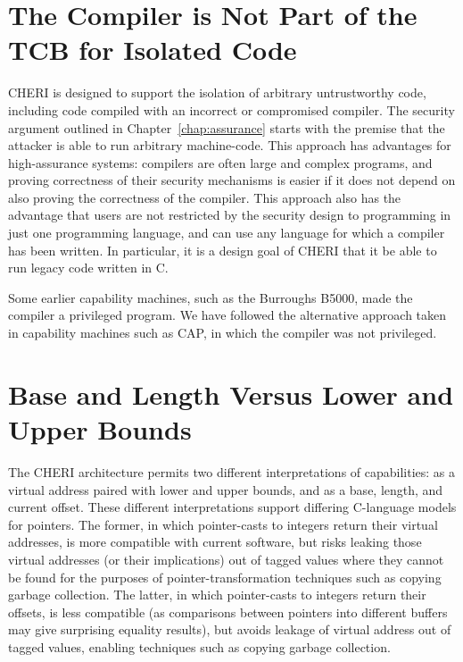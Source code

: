 \section{The Compiler is Not Part of the TCB for Isolated Code}

CHERI is designed to support the isolation of arbitrary untrustworthy code,
including code compiled with an incorrect or compromised compiler.
The security argument outlined in
Chapter~\ref{chap:assurance} starts with the premise that the attacker is able to
run arbitrary machine-code. This approach has advantages for high-assurance systems:
compilers are often large and complex programs, and proving correctness of their
security mechanisms is easier if it does not depend on also proving the correctness
of the compiler. This approach also has the advantage that users are not restricted
by the security design to programming in just one programming language, and can use
any language for which a compiler has been written. In particular, it is a design
goal of CHERI that it be able to run legacy code written in C.

Some earlier capability machines, such as the Burroughs B5000, made the compiler
a privileged program. We have followed the alternative approach taken in capability machines
such as CAP, in which the compiler was not privileged.


\section{Base and Length Versus Lower and Upper Bounds}

The CHERI architecture permits two different interpretations of capabilities:
as a virtual address paired with lower and upper bounds, and as a base,
length, and current offset.
These different interpretations support differing C-language models for
pointers.
The former, in which pointer-casts to integers return their virtual addresses,  is more compatible with current software, but risks leaking those virtual
addresses (or their implications) out of tagged values where they cannot be
found for the purposes of pointer-transformation techniques such as copying
garbage collection.
The latter, in which pointer-casts to integers return their offsets, is less
compatible (as comparisons between pointers into different buffers may give
surprising equality results), but avoids leakage of virtual address out of
tagged values, enabling techniques such as copying garbage collection.

